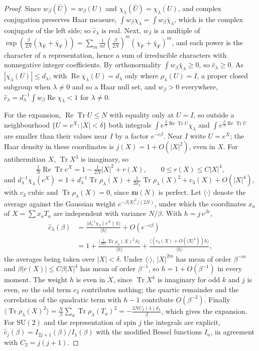 \documentclass[aps,prd,twocolumn,superscriptaddress,nofootinbib,longbibliography,floatfix,amsmath,amssymb,10pt]{revtex4-2}
\theoremstyle{definition}
\theoremstyle{remark}
\newcommand{\SU}{\mathrm{SU}}
\newcommand{\Tr}{\operatorname{Tr}}
\newcommand{\ReTr}{\operatorname{Re}\operatorname{Tr}}
\begin{document}
\begin{proof}
Since $w_\beta(\bar U)=w_\beta(U)$ and $\chi_\lambda(\bar U)=
\overline{\chi_\lambda(U)}$, and complex conjugation preserves Haar measure,
$\int w_\beta\chi_\lambda=\int w_\beta\bar\chi_\lambda$, which is the
complex conjugate of the left side; so $\hat c_\lambda$ is real. Next,
$w_\beta$ is a multiple of
$\exp(\frac\beta{2N}(\chi_{\mathrm F}+\bar\chi_{\mathrm F}))=
\sum_{m}\frac1{m!}(\frac\beta{2N})^m(\chi_{\mathrm F}+\bar\chi_{\mathrm
F})^m$, and each power is the character of a representation, hence a sum
of irreducible characters with nonnegative integer coefficients. By
orthonormality $\int w_\beta\bar\chi_\lambda\ge0$, so $\hat
c_\lambda\ge0$. As $|\chi_\lambda(U)|\le d_\lambda$, with
$\operatorname{Re}\chi_\lambda(U)=d_\lambda$ only where
$\rho_\lambda(U)=I$, a proper closed subgroup when $\lambda\ne0$ and so a
Haar null set, and $w_\beta>0$ everywhere, $\hat c_\lambda=d_\lambda^{-1}
\int w_\beta\operatorname{Re}\chi_\lambda<1$ for $\lambda\ne0$.

For the expansion, $\ReTr U\le N$ with equality only at $U=I$, so outside a
neighbourhood $\{U=e^X:|X|<\delta\}$ both integrals $\int e^{\frac\beta
N\ReTr U}\chi_\lambda$ and $\int e^{\frac\beta N\ReTr U}$ are smaller than
their values near $I$ by a factor $e^{-c\beta}$. Near $I$ write $U=e^X$;
the Haar density in these coordinates is $j(X)=1+O(|X|^2)$, even in $X$.
For antihermitian $X$, $\Tr X^3$ is imaginary, so
\[
\tfrac1N\ReTr e^X=1-\tfrac1{2N}|X|^2+r(X),\qquad 0\le r(X)\le C|X|^4,
\]
and $d_\lambda^{-1}\chi_\lambda(e^X)=1+d_\lambda^{-1}\Tr\rho_\lambda(X)+
\frac1{2d_\lambda}\Tr\rho_\lambda(X)^2+c_3(X)+O(|X|^4)$, with $c_3$ cubic and
$\Tr\rho_\lambda(X)=0$, since $\mathfrak{su}(N)$ is perfect. Let
$\langle\cdot\rangle$ denote the average against the Gaussian weight
$e^{-\beta|X|^2/(2N)}$, under which the coordinates $x_a$ of $X=\sum
x_aT_a$ are independent with variance $N/\beta$. With $h=j\,e^{\beta r}$,
\[
\begin{split}
\hat c_\lambda(\beta)&=\frac{\langle d_\lambda^{-1}\chi_\lambda(e^X)\,
h\rangle}{\langle h\rangle}+O(e^{-c\beta})\\
&=1+\frac{\langle\frac1{2d_\lambda}\Tr\rho_\lambda(X)^2\,h\rangle}
{\langle h\rangle}+\frac{\langle(c_3(X)+O(|X|^4))h\rangle}{\langle h\rangle},
\end{split}
\]
the averages being taken over $|X|<\delta$. Under $\langle\cdot\rangle$,
$|X|^{2m}$ has mean of order $\beta^{-m}$ and $\beta|r(X)|\le C\beta|X|^4$
has mean of order $\beta^{-1}$, so $h=1+O(\beta^{-1})$ in every moment. The
weight $h$ is even in $X$, since $\Tr X^k$ is imaginary for odd $k$ and $j$
is even, so the odd term $c_3$ contributes nothing; the quartic remainder and
the correlation of the quadratic term with $h-1$ contribute $O(\beta^{-2})$. Finally $\langle\Tr\rho_\lambda(X)^2\rangle=
\frac N\beta\sum_a\Tr\rho_\lambda(T_a)^2=-\frac{2NC_2(\lambda)d_\lambda}
\beta$, which gives the expansion. For $\SU(2)$ and the representation of
spin $j$ the integrals are explicit, $\hat c_j(\beta)=I_{2j+1}(\beta)/
I_1(\beta)$ with the modified Bessel functions $I_n$, in agreement with
$C_2=j(j+1)$.
\end{proof}
\end{document}
